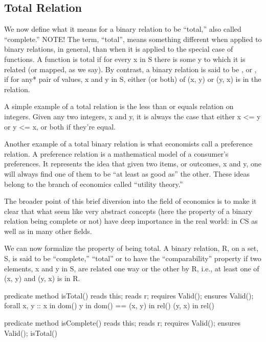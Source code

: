 \documentclass[letterpaper,10pt,english]{sphinxmanual}
\begin{document}
\subsection{Total Relation}
\label{\detokenize{08-relations:total-relation}}
We now define what it means for a binary relation to be “total,” also
called “complete.” NOTE!  The term, “total”, means something different
when applied to binary relations, in general, than when it is applied
to the special case of functions. A function is total if for every x
in S there is some y to which it is related (or mapped, as we say). By
contrast, a binary relation is said to be , or , if
for any* pair of values, x and y in S, either (or both) of (x, y) or
(y, x) is in the relation.

A simple example of a total relation is the less than or equals
relation on integers. Given any two integers, x and y, it is always
the case that either x \textless{}= y or y \textless{}= x, or both if they’re equal.

Another example of a total binary relation is what economists call a
preference relation. A preference relation is a mathematical model of
a consumer’s preferences. It represents the idea that given  two
items, or outcomes, x and y, one will always find one of them to be
“at least as good as” the other. These ideas belong to the branch of
economics called “utility theory.”

The broader point of this brief diversion into the field of economics
is to make it clear that what seem like very abstract concepts (here
the property of a binary relation being complete or not) have deep
importance in the real world: in CS as well as in many other fields.

We can now formalize the property of being total.  A binary relation,
R, on a set, S, is said to be “complete,” “total” or to have the
“comparability” property if  two elements, x and y in S, are
related one way or the other by R, i.e., at least one of (x, y) and
(y, x) is in R.

\begin{sphinxVerbatim}[commandchars=\\\{\}]
predicate method isTotal()
    reads this;
    reads r;
    requires Valid();
    ensures Valid();
\PYGZob{}
    forall x, y :: x in dom() \PYGZam{}\PYGZam{} y in dom() ==\PYGZgt{}
         (x, y) in rel() \textbar{}\textbar{} (y, x) in rel()
\PYGZcb{}


predicate method isComplete()
    reads this;
    reads r;
    requires Valid();
    ensures Valid();
\PYGZob{}
    isTotal()
\PYGZcb{}
\end{sphinxVerbatim}
\end{document}
